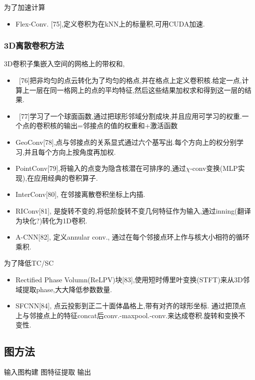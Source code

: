 \documentclass{article}
\begin{document}
为了加速计算
\begin{itemize}
    \item Flex-Conv. [75],定义卷积为在kNN上的标量积,可用CUDA加速.
\end{itemize}

\subsubsection{3D离散卷积方法}

3D卷积\tRarr 子集嵌入空间的网格上的带权和,
\begin{itemize}
    \item \ [76]把非均匀的点云转化为了均匀的格点,并在格点上定义卷积核.给定一点,计算上一层在同一格网上的点的平均特征,然后这些结果加权求和得到这一层的结果.
    \item \ [77]学习了一个球面函数,通过把球形邻域分割成块,并且应用可学习的权重.一个点的卷积核的输出=邻接点的值的权重和+激活函数
    \item GeoConv[78],点与邻接点的关系显式通过六个基写出.每个方向上的权分别学习,并且每个方向上按角度再加权.
    \item PointConv[79],将输入的点变为隐含核潜在可排序的,通过$\chi$-conv变换(MLP实现),在应用经典的卷积算子.
    \item InterConv[80], 在邻接离散卷积坐标上内插.
    \item RIConv[81], 是旋转不变的,将低阶旋转不变几何特征作为输入,通过inning(翻译为块化?)转化为1D卷积.
    \item A-CNN[82], 定义annular conv., 通过在每个邻接点环上作与核大小相符的循环乘积.
\end{itemize}

为了降低TC/SC
\begin{itemize}
    \item Rectified Phase Volumn(ReLPV)块[83],使用短时傅里叶变换(STFT)来从3D邻域提取phase,大大降低参数数量.
    \item SFCNN[84], 点云投影到正二十面体晶格上,带有对齐的球形坐标. 通过把顶点上与邻接点上的特征concat后conv.-maxpool.-conv.来达成卷积.\trarr 旋转和变换不变性.
\end{itemize}

\subsection{图方法}

输入\trarr 图构建 \trarr 图特征提取 \trarr 输出
\end{document}
